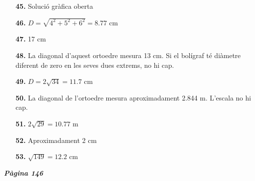 \documentclass[a4paper, pdf, twoside]{book}
\begin{document}
\begin{multicols}{2}
\begin{enumerate}
\vspace{0.25cm}
\item[\fontfamily{phv}\selectfont\color{blue}\textbf{45. }] 
Solució gràfica oberta
\vspace{0.25cm}
\item[\fontfamily{phv}\selectfont\color{blue}\textbf{46. }] 
$D=\sqrt {4^2+5^2+6^2}=8.77$ cm
\vspace{0.25cm}
\item[\fontfamily{phv}\selectfont\color{blue}\textbf{47. }] 
17 cm
\vspace{0.25cm}
\item[\fontfamily{phv}\selectfont\color{blue}\textbf{48. }] 
La diagonal d'aquest ortoedre mesura 13 cm. Si el bolígraf té diàmetre diferent de zero en les seves dues extrems, no hi cap.
\vspace{0.25cm}
\item[\fontfamily{phv}\selectfont\color{blue}\textbf{49. }] 
$D=2\sqrt {34}=11.7$ cm
\vspace{0.25cm}
\item[\fontfamily{phv}\selectfont\color{blue}\textbf{50. }] 
La diagonal de l'ortoedre mesura aproximadament 2.844 m. L'escala no hi cap.
\vspace{0.25cm}
\item[\fontfamily{phv}\selectfont\color{blue}\textbf{51. }] 
$2\sqrt {29}=10.77$ m
\vspace{0.25cm}
\item[\fontfamily{phv}\selectfont\color{blue}\textbf{52. }] 
Aproximadament 2 cm
\vspace{0.25cm}
\item[\fontfamily{phv}\selectfont\color{blue}\textbf{53. }] 
$\sqrt {149}=12.2$ cm
 \end{enumerate}
\vspace{0.3cm}


{\textbf{\em Pàgina 146}} \hrulefill
\begin{enumerate}
\vspace{0.25cm}




\end{enumerate}
\end{multicols}
\end{document}
